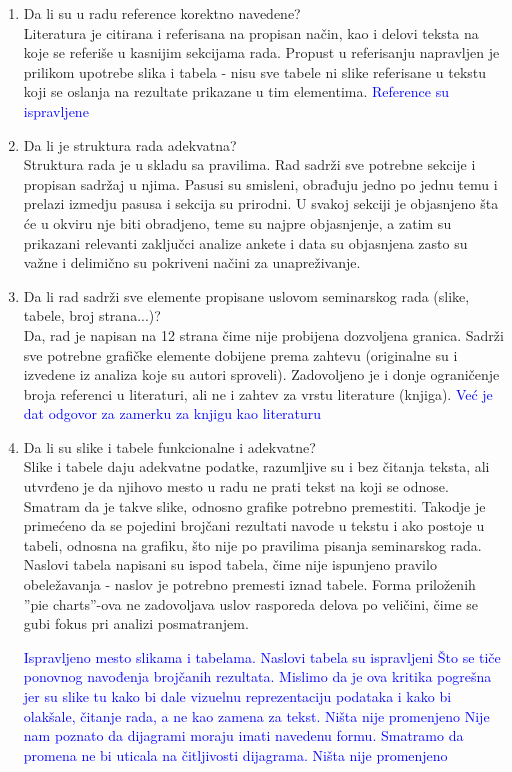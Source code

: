 \documentclass[a4paper]{report}
\newcommand{\odgovor}[1]{\textcolor{blue}{#1}}
\begin{document}
\begin{enumerate}
 \item Da li su u radu reference korektno navedene?\\
 Literatura je citirana i referisana na propisan način, kao i delovi teksta na koje se referiše u kasnijim sekcijama rada. Propust u referisanju napravljen je prilikom upotrebe slika i tabela - nisu sve tabele ni slike referisane u tekstu koji se oslanja na rezultate prikazane u tim elementima.
 \odgovor{Reference su ispravljene}
 
 \item Da li je struktura rada adekvatna?\\
 Struktura rada je u skladu sa pravilima. Rad sadrži sve potrebne sekcije i propisan sadržaj u njima. Pasusi su smisleni, obrađuju jedno po jednu temu i prelazi izmedju pasusa i sekcija su prirodni. U svakoj sekciji je objasnjeno šta će u okviru nje biti obradjeno, teme su najpre objasnjenje, a zatim su prikazani relevanti zaključci analize ankete i data su objasnjena zasto su važne i delimično su pokriveni načini za unapreživanje.
 
 \item Da li rad sadrži sve elemente propisane uslovom seminarskog rada (slike, tabele, broj strana...)?\\
 Da, rad je napisan na 12 strana čime nije probijena dozvoljena granica. Sadrži sve potrebne grafičke elemente dobijene prema zahtevu (originalne su i izvedene iz analiza koje su autori sproveli). Zadovoljeno je i donje ograničenje broja referenci u literaturi, ali ne i zahtev za vrstu literature (knjiga).
 \odgovor {Već je dat odgovor za zamerku za knjigu kao literaturu}
 
 \item Da li su slike i tabele funkcionalne i adekvatne?\\
 Slike i tabele daju adekvatne podatke, razumljive su i bez čitanja teksta, ali utvrđeno je da njihovo mesto u radu ne prati tekst na koji se odnose. Smatram da je takve slike, odnosno grafike potrebno premestiti. Takodje je primećeno da se pojedini brojčani rezultati navode u tekstu i ako postoje u tabeli, odnosna na grafiku, što nije po pravilima pisanja seminarskog rada. Naslovi tabela napisani su ispod tabela, čime nije ispunjeno pravilo obeležavanja - naslov je potrebno premesti iznad tabele.
 Forma priloženih ''pie charts''-ova ne zadovoljava uslov rasporeda delova po veličini, čime se gubi fokus pri analizi posmatranjem.
 
 \odgovor{Ispravljeno mesto slikama i tabelama. Naslovi tabela su ispravljeni}
 \odgovor{Što se tiče ponovnog navođenja brojčanih rezultata. Mislimo da je ova kritika pogrešna jer su slike tu kako bi dale vizuelnu reprezentaciju podataka i kako bi olakšale, čitanje rada, a ne kao zamena za tekst. Ništa nije promenjeno}
 \odgovor{Nije nam poznato da dijagrami moraju imati navedenu formu. Smatramo da promena ne bi uticala na čitljivosti dijagrama. Ništa nije promenjeno}
 
 \end{enumerate}
 
\end{document}
